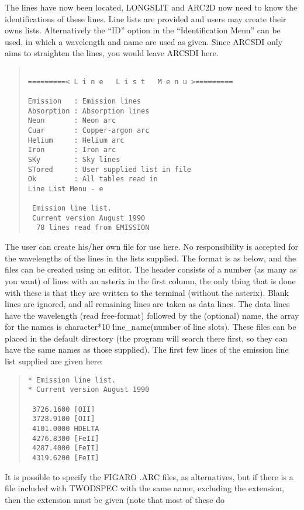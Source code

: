 The lines have now been located, LONGSLIT and ARC2D now need to know the
identifications of these lines.
Line lists are provided and users may create their owns lists.
Alternatively the ``ID'' option in the ``Identification Menu'' can be
used, in which a wavelength and name are used as given.
Since ARCSDI only aims to straighten the lines, you would leave ARCSDI
here.
\begin{quote}\begin{verbatim}
 
=========< L i n e   L i s t   M e n u >=========
 
Emission   : Emission lines
Absorption : Absorption lines
Neon       : Neon arc
Cuar       : Copper-argon arc
Helium     : Helium arc
Iron       : Iron arc
SKy        : Sky lines
STored     : User supplied list in file
Ok         : All tables read in
Line List Menu - e
 
 Emission line list.
 Current version August 1990
  78 lines read from EMISSION
\end{verbatim}\end{quote}
The user can create his/her own file for use here.
No responsibility is accepted for the wavelengths of the lines in the
lists supplied.
The format is as below, and the files can be created using an editor.
The header consists of a number (as many as you want) of lines with an
asterix in the first column, the only thing that is done with
these is that they are written to the terminal (without the asterix).
Blank lines are ignored, and all remaining lines are taken as data lines.
The data lines have the wavelength (read free-format) followed by the
(optional) name, the array for the names is character*10 line\_name(number
of line slots).
These files can be placed in the default directory (the program will
search there first, so they can have the same names as those supplied).
The first few lines of the emission line list supplied are given here:
\begin{quote}\begin{verbatim}
* Emission line list.
* Current version August 1990

 3726.1600 [OII]
 3728.9100 [OII]
 4101.0000 HDELTA
 4276.8300 [FeII]
 4287.4000 [FeII]
 4319.6200 [FeII]
\end{verbatim}\end{quote}
It is possible to specify the FIGARO .ARC files, as alternatives, but if
there is a file included with TWODSPEC with the same name, excluding the
extension, then the extension must be given (note that most of these do
